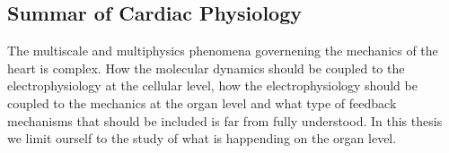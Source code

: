 \subsection{Summar of Cardiac Physiology}
The multiscale and multiphysics phenomena governening the mechanics of
the heart is complex. How the molecular dynamics should be coupled to
the electrophysiology at the cellular level, how the electrophysiology
should be coupled to the mechanics at the organ level and what type of
feedback mechanisms that should be included is far from fully
understood. In this thesis we limit ourself to the study of what is
happending on the organ level.


